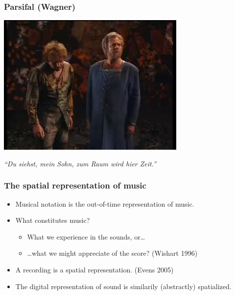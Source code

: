 \documentclass{beamer}
\begin{document}
\begin{frame}
  \frametitle{Parsifal (Wagner)}
  \begin{center}
    \href{run:media/Parsifal.mp4}{\includegraphics[width=.6\textwidth]{media/parsifal-splash.jpg}}
  \end{center}
  \begin{center}
    \emph{``Du siehst, mein Sohn, zum Raum wird hier Zeit.''}
  \end{center}
\end{frame}

\begin{frame}
   \frametitle{The spatial representation of music}
   \pause[2]
   \begin{block}{}
     \begin{itemize}
     \item<2-> Musical notation is the out-of-time representation of music.
     \item<3-> What constitutes music?
       \begin{itemize}
       \item<4-> What we experience in the sounds, or\ldots
       \item<5-> \ldots what we might appreciate of the score? (Wishart 1996)
       \end{itemize}
     \item<6-> A recording is a spatial representation. (Evens 2005)
     \item<7-> The digital representation of sound is similarily (abstractly) spatialized. 
     \end{itemize}
   \end{block}
\end{frame}
\end{document}

